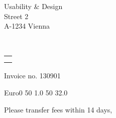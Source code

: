 \documentclass{letter}
\date{2013-09-22}
\makeatletter
\renewcommand*{\opening}[1]{\ifx\@empty\fromaddress%
  \thispagestyle{firstpage}%
    {\raggedleft\@date\par}%
  \else%
   \thispagestyle{empty}%
   {%
    \begin{minipage}[t]{0.50\linewidth}
        \toname \\
        \toaddress
    \end{minipage}
    \begin{minipage}[t]{0.45\linewidth}
        \raggedleft\begin{tabular}[t]{l@{}}\ignorespaces
            \fromaddress\\[1.0em]%
            \@date
        \end{tabular}
    \end{minipage}
    \par
}%
\fi
\vspace{2\parskip}%
#1\par\nobreak}
\makeatother
\begin{document}
  \begin{letter}{Usability \& Design \\ Street 2 \\ A-1234 Vienna}
    \opening{Invoice no. 130901}
    \thispagestyle{fancy}
    
    \begin{invoice}{Euro}{0}
                   {50} {1.0}
                   {50} {32.0}
                  \end{invoice}
    \closing{Please transfer fees within 14 days,}

    \cfoot{}

  \end{letter}
\end{document}
